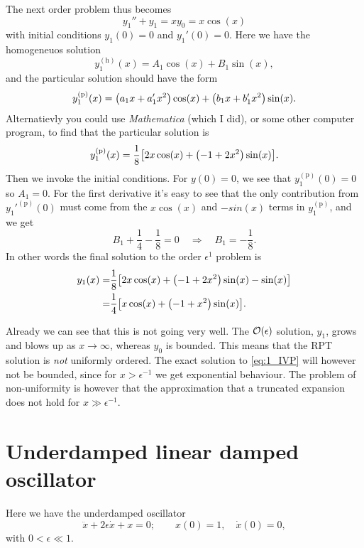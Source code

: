 \documentclass[11pt,letter, swedish, english
]{article}
\begin{document}
The next order problem thus becomes
\begin{equation}
y_1''+y_1=xy_0=x\cos(x)
\end{equation}
with initial conditions $y_1(0)=0$ and $y_1'(0)=0$. Here we have the
homogeneuos solution
\begin{equation}
y_1^{(\text{h})}(x)=A_1\cos(x)+B_1\sin(x),
\end{equation}
and the particular solution should have the form
\begin{equation}
y_1^{(\text{p})}(x)=\qty(a_1x+a_1'x^2)\cos(x)+\qty(b_1x+b_1'x^2)\sin(x).
\end{equation}
Alternatievly you could use \textit{Mathematica} (which I did), or
some other computer program, to find that the particular solution is 
\begin{equation}
y_1^{(\text{p})}(x)=\frac{1}{8}\qty[
2x\cos(x)+\qty(-1+2x^2)\sin(x)].
\end{equation}
Then we invoke the initial conditions. For $y(0)=0$, we see that
$y_1^{(\text{p})}(0)=0$ so $A_1=0$. For the first derivative it's easy
to see that the only contribution from ${y_1'}^{(\text{p})}(0)$ must
come from the $x\cos(x)$ and $-sin(x)$ terms in $y_1^{(\text{p})}$,
and we get
\begin{equation}
B_1+\frac{1}{4}-\frac{1}{8}=0
\quad\Longrightarrow\quad
B_1=-\frac{1}{8}.
\end{equation}
In other words the final solution to the order $\epsilon^1$ problem is
\begin{equation}
\begin{aligned}
y_1(x)=&\frac{1}{8}\qty[2x\cos(x)+\qty(-1+2x^2)\sin(x)-\sin(x)]\\
=&\frac{1}{4}\qty[x\cos(x)+\qty(-1+x^2)\sin(x)].
\end{aligned}
\end{equation}

Already we can see that this is not going very well. The
$\order{\epsilon}$ solution, $y_1$, grows and blows up as
$x\to\infty$, whereas $y_0$ is bounded. This means that the RPT
solution is \emph{not} uniformly ordered. The exact solution to
\eqref{eq:1_IVP} will however not be bounded, since for
$x>\epsilon^{-1}$ we get exponential behaviour. The problem of
non-uniformity is however that the approximation that a truncated
expansion does not hold for $x\gg\epsilon^{-1}$. 






\section{Underdamped linear damped oscillator}
Here we have the underdamped oscillator
\begin{equation}
\ddot{x}+2\epsilon\dot{x}+x=0;\qquad
x(0)=1,\quad \dot{x}(0)=0,
\end{equation}
with $0<\epsilon\ll1$.
\end{document}
